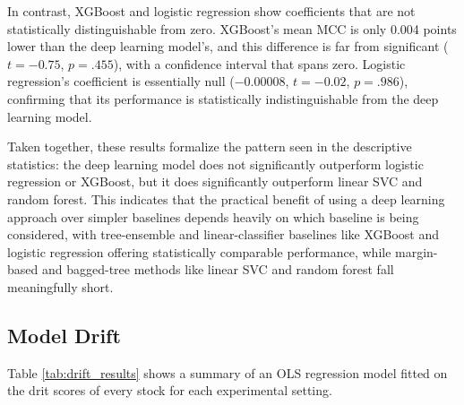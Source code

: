 \documentclass[stu,floatsintext]{apa7}
\begin{document}
In contrast, XGBoost and logistic regression show coefficients that are not statistically distinguishable from zero. XGBoost's mean MCC is only 0.004 points lower than the deep learning model's, and this difference is far from significant ($t = -0.75$, $p = .455$), with a confidence interval that spans zero. Logistic regression's coefficient is essentially null ($-0.00008$, $t = -0.02$, $p = .986$), confirming that its performance is statistically indistinguishable from the deep learning model.

Taken together, these results formalize the pattern seen in the descriptive statistics: the deep learning model does not significantly outperform logistic regression or XGBoost, but it does significantly outperform linear SVC and random forest. This indicates that the practical benefit of using a deep learning approach over simpler baselines depends heavily on which baseline is being considered, with tree-ensemble and linear-classifier baselines like XGBoost and logistic regression offering statistically comparable performance, while margin-based and bagged-tree methods like linear SVC and random forest fall meaningfully short.

\subsection{Model Drift}

Table \ref{tab:drift_results} shows a summary of an OLS regression model fitted on the drit scores of every stock for each experimental setting.
\medskip
\medskip
\end{document}
